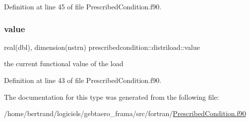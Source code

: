Definition at line 45 of file Prescribed\+Condition.\+f90.

\mbox{\label{structprescribedcondition_1_1distriload_a32fb9fe519f0164a70313c8e7627976b}} 
\subsubsection{\texorpdfstring{value}{value}}
{\footnotesize\ttfamily real(dbl), dimension(nstrn) prescribedcondition\+::distriload\+::value\hspace{0.3cm}{\ttfamily [private]}}



the current functional value of the load 



Definition at line 43 of file Prescribed\+Condition.\+f90.



The documentation for this type was generated from the following file\+:\begin{DoxyCompactItemize}
\item 
/home/bertrand/logiciels/gebtaero\+\_\+frama/src/fortran/\hyperlink{_prescribed_condition_8f90}{Prescribed\+Condition.\+f90}\end{DoxyCompactItemize}
